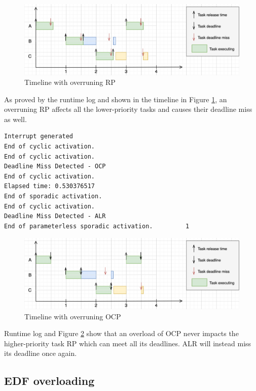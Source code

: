 \documentclass{article}
\begin{document}
\begin{figure}[!htbp]
\centering
\includegraphics[width=6.5in]{images/timeline-overload-fps-rp}
\caption{Timeline with overruning RP}
\label{timeline-overload-fps-rp}
\end{figure}

As proved by the runtime log and shown in the timeline in Figure \ref{timeline-overload-fps-rp}, an overruning RP affects all the lower-priority tasks and causes their deadline miss as well.

\begin{lstlisting}
Interrupt generated
End of cyclic activation.
End of cyclic activation.
Deadline Miss Detected - OCP
End of cyclic activation.
Elapsed time: 0.530376517
End of sporadic activation.
End of cyclic activation.
Deadline Miss Detected - ALR
End of parameterless sporadic activation.         1
\end{lstlisting}

\begin{figure}[!htbp]
\centering
\includegraphics[width=6.5in]{images/timeline-overload-fps-ocp}
\caption{Timeline with overruning OCP}
\label{timeline-overload-fps-ocp}
\end{figure}

Runtime log and Figure \ref{timeline-overload-fps-ocp} show that an overload of OCP never impacts the higher-priority task RP which can meet all its deadlines. ALR will instead miss its deadline once again.

\subsection{EDF overloading}
\end{document}
